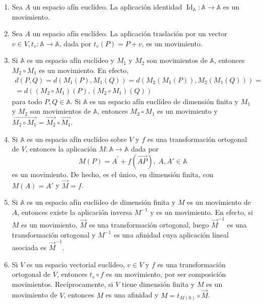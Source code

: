 \documentclass[12pt, a4paper, ones, notitlepage, openany,titlepage]{article}
\begin{document}
\begin{enumerate}[label=(\arabic*)]
\item Sea $A$ un espacio afín euclídeo. La aplicación identidad $\operatorname{Id}_{\mathbb{A}}: \mathbb{A} \rightarrow \mathbb{A}$ es un movimiento.

\item Sea $A$ un espacio afín euclídeo. La aplicación traslación por un vector $v \in V, t_{v}: \mathbb{A} \rightarrow \mathbb{A}$, dada por $t_{v}(P)=P+v$, es un movimiento.

\item Si $\mathbb{A}$ es un espacio afín euclídeo y $M_{1}$ y $M_{2}$ son movimientos de $\mathbb{A}$, entonces $M_{2} \circ M_{1}$ es un movimiento. En efecto,
\begin{gather*}
d(P, Q)=d\left(M_{1}(P), M_{1}(Q)\right)=d\left(M_{2}\left(M_{1}(P)\right), M_{2}\left(M_{1}(Q)\right)\right)= \\ =d\left(\left(M_{2} \circ M_{1}\right)(P),\left(M_{2} \circ M_{1}\right)(Q)\right)
\end{gather*}
para todo $P, Q \in \mathbb{A}$. Si $\mathbb{A}$ es un espacio afín euclídeo de dimensión finita y $M_{1}$ y $M_{2}$ son movimientos de $\mathbb{A}$, entonces $M_{2} \circ M_{1}$ es un movimiento y $\overrightarrow{M_{2} \circ M_{1}}=\overrightarrow{M_{2}} \circ \overrightarrow{M_{1}}$.

\item Si $\mathbb{A}$ es un espacio afín euclídeo sobre $V$ y $f$ es una transformación ortogonal de $V$, entonces la aplicación $M: \mathbb{A} \rightarrow \mathbb{A}$ dada por
$$
M(P)=A^{\prime}+f(\overrightarrow{A P}), \; A,A' \in \mathbb{A}
$$
es un movimiento. De hecho, es el único, en dimensión finita, con $M(A) = A'$ y $\overrightarrow{M} = f$.

\item Si $\mathbb{A}$ es un espacio afín euclídeo de dimensión finita y $M$ es un movimiento de $A$, entonces existe la aplicación inversa $M^{-1}$ y es un movimiento. En efecto, si $M$ es un movimiento, $\overrightarrow{M}$ es una transformación ortogonal, luego $\overrightarrow{M}^{-1}$ es una transformación ortogonal y $M^{-1}$ es una afinidad cuya aplicación lineal asociada es $\overrightarrow{M}^{-1}$.

\item Si $V$ es un espacio vectorial euclídeo, $v \in V$ y $f$ es una transformación ortogonal de $V$, entonces $t_{v} \circ f$ es un movimiento, por ser composición movimientos. Recíprocamente, si $V$ tiene dimensión finita y $M$ es un movimiento de $V$, entonces $M$ es una afinidad y $M=t_{M(0)} \circ \overrightarrow{M}$.
\end{enumerate}
\end{document}

